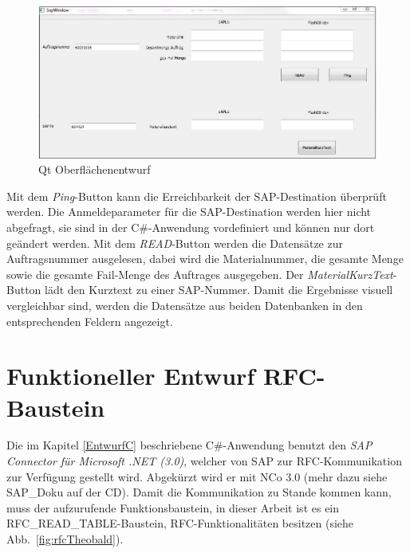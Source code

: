 \begin{figure}[H]
\centering
\includegraphics[width=1\linewidth]{images/QtObeflaechenentwurf}
\caption[Qt Oberflächenentwurf]{Qt Oberflächenentwurf}
\label{fig:QtObeflaechenentwurf}
\end{figure}
Mit dem \textit{Ping}-Button kann die Erreichbarkeit der SAP-Destination überprüft werden. Die Anmeldeparameter für die SAP-Destination werden hier nicht abgefragt, sie sind in der C\#-Anwendung vordefiniert und können nur dort geändert werden. Mit dem \textit{READ}-Button werden die Datensätze zur Auftragsnummer ausgelesen, dabei wird die Materialnummer, die gesamte Menge sowie die gesamte Fail-Menge des Auftrages ausgegeben. Der \textit{MaterialKurzText}-Button lädt den Kurztext zu einer SAP-Nummer. Damit die Ergebnisse visuell vergleichbar sind, werden die Datensätze aus beiden Datenbanken in den entsprechenden Feldern angezeigt. 

\section{Funktioneller Entwurf RFC-Baustein}
Die im Kapitel \ref{EntwurfC} beschriebene C\#-Anwendung benutzt den \textit{SAP Connector für Microsoft .NET (3.0)}, welcher von SAP zur RFC-Kommunikation zur Verfügung gestellt wird. Abgekürzt wird er mit NCo 3.0 (mehr dazu siehe SAP\_Doku auf der CD). Damit die Kommunikation zu Stande kommen kann, muss der aufzurufende Funktionsbaustein, in dieser Arbeit ist es ein RFC\_READ\_TABLE-Baustein, RFC-Funktionalitäten besitzen (siehe \mbox{Abb. \ref{fig:rfcTheobald}}). 

